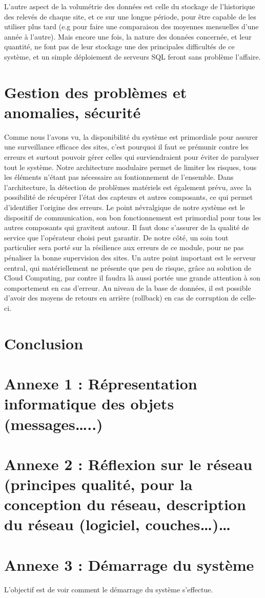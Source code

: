 L'autre aspect de la volumétrie des données est celle du stockage de l'historique des relevés de chaque site, et ce sur une longue période, pour être capable de les utiliser plus tard (e.g pour faire une comparaison des moyennes mensuelles d'une année à l'autre). Mais encore une fois, la nature des données concernée, et leur quantité, ne font pas de leur stockage une des principales difficultés de ce système, et un simple déploiement de serveurs SQL feront sans problème l'affaire.

\section{Gestion des problèmes et anomalies, sécurité}

Comme nous l'avons vu, la disponibilité du système est primordiale pour assurer une surveillance efficace des sites, c'est pourquoi il faut se prémunir contre les erreurs et surtout pouvoir gérer celles qui surviendraient pour éviter de paralyser tout le système. Notre architecture modulaire permet de limiter les risques, tous les éléments n'étant pas nécessaire au fontionnement de l'ensemble.
Dans l'architecture, la détection de problèmes matériels est également prévu, avec la possibilité de récupérer l'état des capteurs et autres composants, ce qui permet d'identifier l'origine des erreurs.
Le point névralgique de notre système est le dispositif de communication, son bon fonctionnement est primordial pour tous les autres composants qui gravitent autour. Il faut donc s'assurer de la qualité de service que l'opérateur choisi peut garantir. De notre côté, un soin tout particulier sera porté sur la résilience aux erreurs de ce module, pour ne pas pénaliser la bonne supervision des sites.
Un autre point important est le serveur central, qui matériellement ne présente que peu de risque, grâce au solution de Cloud Computing, par contre il faudra là aussi portée une grande attention à son comportement en cas d'erreur. Au niveau de la base de données, il est possible d'avoir des moyens de retours en arrière (rollback) en cas de corruption de celle-ci.


\section{Conclusion}

\section{Annexe 1 : Répresentation informatique des objets (messages…..)}

\section{Annexe 2 : Réflexion sur le réseau (principes qualité, pour la conception du réseau,
description du réseau (logiciel, couches…)…}

\section{Annexe 3 : Démarrage du système}
L'objectif est de voir comment le démarrage du système s'effectue.
